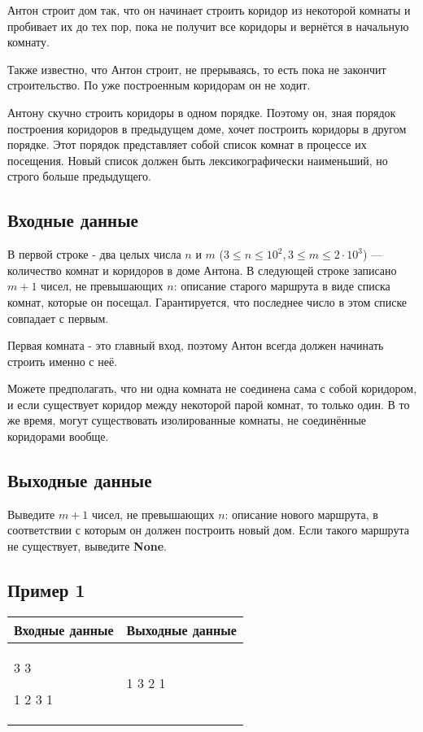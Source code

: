 \documentclass{extarticle}
\begin{document}
Антон строит дом так, что он начинает строить коридор из
некоторой комнаты и пробивает их до тех пор, пока
не получит все коридоры и вернётся в начальную комнату.

Также известно, что Антон строит, не прерываясь, то есть пока не
закончит строительство. По уже построенным коридорам он не ходит.

Антону скучно строить коридоры в одном порядке. Поэтому он,
зная порядок построения коридоров в предыдущем доме, хочет
построить коридоры в другом порядке.
Этот порядок представляет собой список комнат в процессе их
посещения.
Новый список должен быть лексикографически наименьший,
но строго больше предыдущего.

\subsection*{Входные данные}
\label{sec:orgeb4908d}

В первой строке - два целых числа \(n\) и \(m\)
(\(3 \leq n \leq 10^{2}\), \(3 \leq m \leq 2\cdot 10^{3}\)) — количество комнат и коридоров в
доме Антона.
В следующей строке записано \(m + 1\) чисел, не превышающих \(n\):
описание старого маршрута в виде списка комнат,
которые он посещал.
Гарантируется, что последнее число в этом списке
совпадает с первым.

Первая комната - это главный вход, поэтому Антон всегда
должен начинать строить именно с неё.

Можете предполагать, что ни одна комната не соединена сама
с собой коридором, и если существует коридор между
некоторой парой комнат, то только один.
В то же время, могут существовать изолированные комнаты,
не соединённые коридорами вообще.

\subsection*{Выходные данные}
\label{sec:orged795e8}

Выведите \(m + 1\) чисел, не превышающих \(n\):
описание нового маршрута, в соответствии с которым он должен
построить новый дом.
Если такого маршрута не существует, выведите \textbf{None}.

\subsection*{Пример 1}
\label{sec:org6a26c04}

\begin{table}[H]
\begin{center}
\begin{tabular}{|m{4cm}|m{4cm}|}
\hline
Входные данные & Выходные данные \\ \hline
3 3

1 2 3 1
&
1 3 2 1
\\ \hline
\end{tabular}
\end{center}
\end{table}
\end{document}
